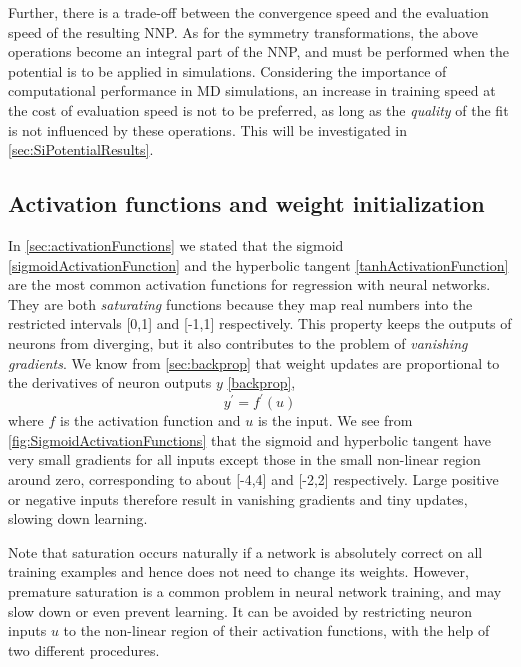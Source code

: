 \documentclass[twoside,english]{uiofysmaster}
\begin{document}
Further, there is a trade-off between the convergence speed and the evaluation speed of the resulting NNP. 
As for the symmetry transformations, the above operations become an integral part of the NNP, and must be performed 
when the potential is to be applied in simulations. Considering the importance of computational performance in MD simulations,
an increase in training speed at the cost of evaluation speed is not to be preferred, as long as the \textit{quality} of the fit 
is not influenced by these operations. This will be investigated in \autoref{sec:SiPotentialResults}. 



\subsection{Activation functions and weight initialization} \label{sec:hyperParamsActFunctions}
In \autoref{sec:activationFunctions} we stated that the sigmoid \eqref{sigmoidActivationFunction} and 
the hyperbolic tangent \eqref{tanhActivationFunction} are the most common activation functions for regression
with neural networks. They are both \textit{saturating} functions because they map real numbers into the restricted intervals 
[0,1] and [-1,1] respectively. This property keeps the outputs of neurons from diverging, but it also contributes to 
the problem of \textit{vanishing gradients}. We know from \autoref{sec:backprop} that
weight updates are proportional to the derivatives of neuron outputs $y$ \eqref{backprop},
\begin{equation}
 y^\prime = f^\prime(u)
\end{equation}
where $f$ is the activation function and $u$ is the input. 
We see from \autoref{fig:SigmoidActivationFunctions} that the sigmoid and hyperbolic
tangent have very small gradients for all inputs except those in the small non-linear region around zero, corresponding 
to about [-4,4] and [-2,2] respectively. 
Large positive or negative inputs therefore result in vanishing gradients and tiny updates, slowing down learning. 

Note that saturation occurs naturally if a network is absolutely correct on all training examples and 
hence does not need to change its weights. However, premature saturation is a common problem in neural network training, and may slow
down or even prevent learning. It can be avoided by restricting neuron inputs $u$ to the non-linear region of their 
activation functions, with the help of two different procedures. 
\end{document}

